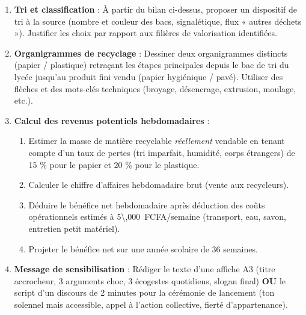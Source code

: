 \documentclass[11pt]{article}
\begin{document}
\begin{enumerate}
\item \textbf{Tri et classification} : À partir du bilan ci-dessus, proposer un dispositif de tri à la source (nombre et couleur des bacs, signalétique, flux « autres déchets »). Justifier les choix par rapport aux filières de valorisation identifiées.
\item \textbf{Organigrammes de recyclage} : Dessiner deux organigrammes distincts (papier / plastique) retraçant les étapes principales depuis le bac de tri du lycée jusqu'au produit fini vendu (papier hygiénique / pavé). Utiliser des flèches et des mots-clés techniques (broyage, désencrage, extrusion, moulage, etc.).
\item \textbf{Calcul des revenus potentiels hebdomadaires} :
      \begin{enumerate}
      \item Estimer la masse de matière recyclable \emph{réellement} vendable en tenant compte d'un taux de pertes (tri imparfait, humidité, corps étrangers) de 15 \% pour le papier et 20 \% pour le plastique.
      \item Calculer le chiffre d'affaires hebdomadaire brut (vente aux recycleurs).
      \item Déduire le bénéfice net hebdomadaire après déduction des coûts opérationnels estimés à \SI{5\,000}{FCFA/semaine} (transport, eau, savon, entretien petit matériel).
      \item Projeter le bénéfice net sur une année scolaire de 36 semaines.
      \end{enumerate}
\item \textbf{Message de sensibilisation} : Rédiger le texte d'une affiche A3 (titre accrocheur, 3 arguments choc, 3 écogestes quotidiens, slogan final) \textbf{OU} le script d'un discours de 2 minutes pour la cérémonie de lancement (ton solennel mais accessible, appel à l'action collective, fierté d'appartenance).
\end{enumerate}
\end{document}
